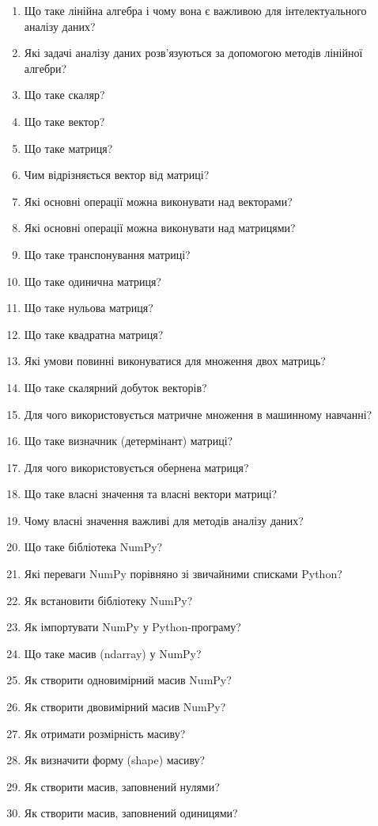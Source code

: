 \begin{enumerate}
\item Що таке лінійна алгебра і чому вона є важливою для інтелектуального аналізу даних?
\item Які задачі аналізу даних розв'язуються за допомогою методів лінійної алгебри?
\item Що таке скаляр?
\item Що таке вектор?
\item Що таке матриця?
\item Чим відрізняється вектор від матриці?
\item Які основні операції можна виконувати над векторами?
\item Які основні операції можна виконувати над матрицями?
\item Що таке транспонування матриці?
\item Що таке одинична матриця?
\item Що таке нульова матриця?
\item Що таке квадратна матриця?
\item Які умови повинні виконуватися для множення двох матриць?
\item Що таке скалярний добуток векторів?
\item Для чого використовується матричне множення в машинному навчанні?
\item Що таке визначник (детермінант) матриці?
\item Для чого використовується обернена матриця?
\item Що таке власні значення та власні вектори матриці?
\item Чому власні значення важливі для методів аналізу даних?
\item Що таке бібліотека NumPy?
\item Які переваги NumPy порівняно зі звичайними списками Python?
\item Як встановити бібліотеку NumPy?
\item Як імпортувати NumPy у Python-програму?
\item Що таке масив (ndarray) у NumPy?
\item Як створити одновимірний масив NumPy?
\item Як створити двовимірний масив NumPy?
\item Як отримати розмірність масиву?
\item Як визначити форму (shape) масиву?
\item Як створити масив, заповнений нулями?
\item Як створити масив, заповнений одиницями?

\end{enumerate}

